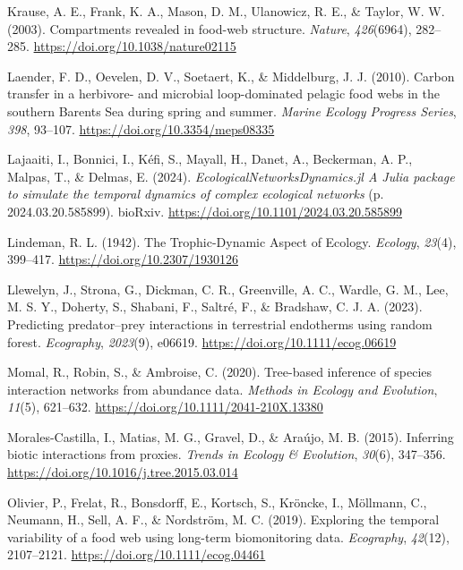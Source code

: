 \documentclass[
]{article}
\newlength{\cslhangindent}
\newenvironment{CSLReferences}[2] %
 {\begin{list}{}{%
  \setlength{\itemindent}{0pt}
  \setlength{\leftmargin}{0pt}
  \setlength{\parsep}{0pt}
  \ifodd #1
   \setlength{\leftmargin}{\cslhangindent}
   \setlength{\itemindent}{-1\cslhangindent}
  \fi
  \setlength{\itemsep}{#2\baselineskip}}}
 {\end{list}}
\begin{document}
\begin{CSLReferences}{1}{0}
Krause, A. E., Frank, K. A., Mason, D. M., Ulanowicz, R. E., \& Taylor,
W. W. (2003). Compartments revealed in food-web structure.
\emph{Nature}, \emph{426}(6964), 282--285.
\url{https://doi.org/10.1038/nature02115}

Laender, F. D., Oevelen, D. V., Soetaert, K., \& Middelburg, J. J.
(2010). Carbon transfer in a herbivore- and microbial loop-dominated
pelagic food webs in the southern {Barents Sea} during spring and
summer. \emph{Marine Ecology Progress Series}, \emph{398}, 93--107.
\url{https://doi.org/10.3354/meps08335}

Lajaaiti, I., Bonnici, I., Kéfi, S., Mayall, H., Danet, A., Beckerman,
A. P., Malpas, T., \& Delmas, E. (2024).
\emph{{EcologicalNetworksDynamics}.jl {A Julia} package to simulate the
temporal dynamics of complex ecological networks} (p.
2024.03.20.585899). bioRxiv.
\url{https://doi.org/10.1101/2024.03.20.585899}

Lindeman, R. L. (1942). The {Trophic-Dynamic Aspect} of {Ecology}.
\emph{Ecology}, \emph{23}(4), 399--417.
\url{https://doi.org/10.2307/1930126}

Llewelyn, J., Strona, G., Dickman, C. R., Greenville, A. C., Wardle, G.
M., Lee, M. S. Y., Doherty, S., Shabani, F., Saltré, F., \& Bradshaw, C.
J. A. (2023). Predicting predator--prey interactions in terrestrial
endotherms using random forest. \emph{Ecography}, \emph{2023}(9),
e06619. \url{https://doi.org/10.1111/ecog.06619}

Momal, R., Robin, S., \& Ambroise, C. (2020). Tree-based inference of
species interaction networks from abundance data. \emph{Methods in
Ecology and Evolution}, \emph{11}(5), 621--632.
\url{https://doi.org/10.1111/2041-210X.13380}

Morales-Castilla, I., Matias, M. G., Gravel, D., \& Araújo, M. B.
(2015). Inferring biotic interactions from proxies. \emph{Trends in
Ecology \& Evolution}, \emph{30}(6), 347--356.
\url{https://doi.org/10.1016/j.tree.2015.03.014}

Olivier, P., Frelat, R., Bonsdorff, E., Kortsch, S., Kröncke, I.,
Möllmann, C., Neumann, H., Sell, A. F., \& Nordström, M. C. (2019).
Exploring the temporal variability of a food web using long-term
biomonitoring data. \emph{Ecography}, \emph{42}(12), 2107--2121.
\url{https://doi.org/10.1111/ecog.04461}


\end{CSLReferences}
\end{document}
